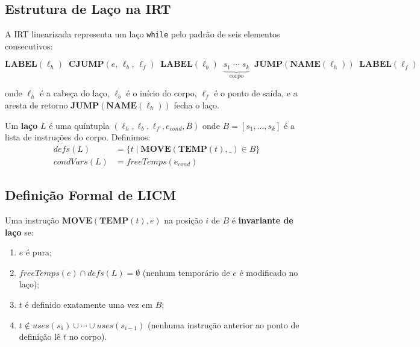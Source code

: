 \subsection{Estrutura de Laço na IRT}

A IRT linearizada representa um laço \texttt{while} pelo padrão de seis
elementos consecutivos:

\[
  \mathbf{LABEL}(\ell_h) \;\;
  \mathbf{CJUMP}(e,\, \ell_b,\, \ell_f) \;\;
  \mathbf{LABEL}(\ell_b) \;\;
  \underbrace{s_1\; \cdots\; s_k}_{\text{corpo}} \;\;
  \mathbf{JUMP}(\mathbf{NAME}(\ell_h)) \;\;
  \mathbf{LABEL}(\ell_f)
\]

onde $\ell_h$ é a cabeça do laço, $\ell_b$ é o início do corpo, $\ell_f$ é o
ponto de saída, e a aresta de retorno $\mathbf{JUMP}(\mathbf{NAME}(\ell_h))$
fecha o laço.

\begin{Definition}\label{def:loop}
  Um \textbf{laço} $L$ é uma quíntupla
  $(\ell_h, \ell_b, \ell_f, e_{\mathit{cond}}, B)$ onde $B = [s_1, \ldots, s_k]$
  é a lista de instruções do corpo.  Definimos:
  \begin{align*}
    \mathit{defs}(L) &= \{ t \mid \mathbf{MOVE}(\mathbf{TEMP}(t), \_)
    \in B \} \\
    \mathit{condVars}(L) &= \mathit{freeTemps}(e_{\mathit{cond}})
  \end{align*}
\end{Definition}

\subsection{Definição Formal de LICM}

\begin{Definition}\label{def:licm}
  Uma instrução $\mathbf{MOVE}(\mathbf{TEMP}(t), e)$ na posição $i$ de $B$
  é \textbf{invariante de laço} se:
  \begin{enumerate}
    \item $e$ é pura;
    \item $\mathit{freeTemps}(e) \cap \mathit{defs}(L) = \emptyset$
      (nenhum temporário de $e$ é modificado no laço);
    \item $t$ é definido exatamente uma vez em $B$;
    \item $t \notin \mathit{uses}(s_1) \cup \cdots \cup \mathit{uses}(s_{i-1})$
      (nenhuma instrução anterior ao ponto de definição lê $t$ no corpo).
  \end{enumerate}
\end{Definition}

